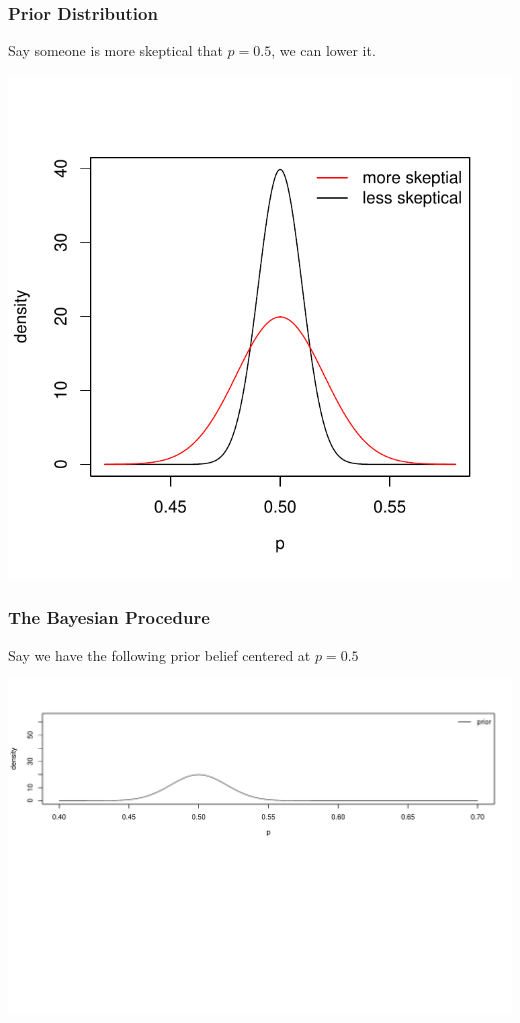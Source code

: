 \documentclass[slides]{beamer}
\begin{document}
\begin{frame}
\frametitle{Prior Distribution}
Say someone is more skeptical that $p=0.5$, we can lower it.  

\begin{center}
\includegraphics[height=0.7\textheight]{figure/prior2.pdf} 
\end{center}

\end{frame}



\begin{frame}
\frametitle{The Bayesian Procedure}
Say we have the following prior belief centered at $p=0.5$
\begin{center}
\includegraphics[width=\textwidth]{figure/bayes1.pdf} 
\end{center}

\end{frame}
\end{document}
